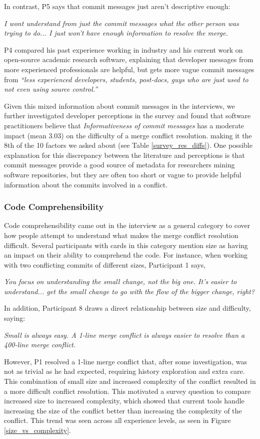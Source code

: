 In contrast, P5 says that commit messages just aren't descriptive enough:
\begin{displayquote}
\textit{I wont understand from just the commit messages what the other person was trying to do... I just won't have enough information to resolve the merge.}
\end{displayquote}

P4 compared his past experience working in industry and his current work on open-source academic research software, explaining that developer messages from more experienced professionals are helpful, but gets more vague commit messages from \textit{``less experienced developers, students, post-docs, guys who are just used to not even using source control.''}

Given this mixed information about commit messages in the interviews, we further investigated developer perceptions in the survey and found that software practitioners believe that \textit{Informativeness of commit messages} has a moderate impact (mean 3.03) on the difficulty of a merge conflict resolution. making it the 8th  of the 10 factors we asked about (see Table \ref{survey_res_diffs}). One possible explanation for this discrepancy between the literature and perceptions is that commit messages provide a good source of metadata for researchers mining software repositories, but they are often too short or vague to provide helpful information about the commits involved in a conflict.
\subsubsection{Code Comprehensibility}
Code comprehensibility came out in the interview as a general category to cover how people attempt to understand what makes the merge conflict resolution difficult. Several participants with cards in this category mention size as having an impact on their ability to comprehend the code. For instance, when working with two conflicting commits of different sizes, Participant 1 says,
\begin{displayquote}
\textit{You focus on understanding the small change, not the big one. It's easier to understand... get the small change to go with the flow of the bigger change, right?}
\end{displayquote}	
In addition, Participant 8 draws a direct relationship between size and difficulty, saying:
\begin{displayquote}
\textit{Small is always easy. A 1-line merge conflict is always easier to resolve than a 400-line merge conflict.}
\end{displayquote}
However, P1 resolved a 1-line merge conflict that, after some investigation, was not as trivial as he had expected, requiring history exploration and extra care. This combination of small size and increased complexity of the conflict resulted in a more difficult conflict resolution.
This motivated a survey question to compare increased size to increased complexity, which showed that current tools handle increasing the size of the conflict better than increasing the complexity of the conflict. This trend was seen across all experience levels, as seen in Figure \ref{size_vs_complexity}.

